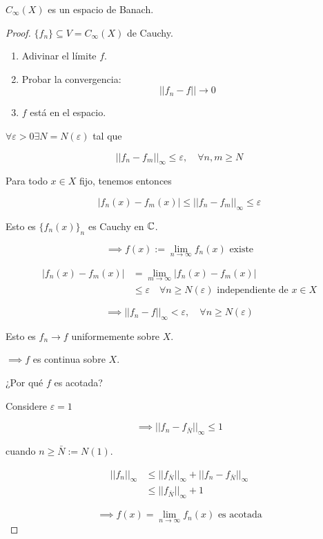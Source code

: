 \documentclass[../Apunte.tex]{subfiles}
\begin{document}
\begin{fproposition}
    $C_\infty(X)$ es un espacio de Banach.
\end{fproposition}

\begin{proof}
    $\{f_n\}\subseteq V=C_\infty(X)$ de Cauchy.

    \begin{enumerate}
        \item Adivinar el límite $f$.
        \item Probar la convergencia:
        \[||f_n-f||\to 0\]
        \item $f$ está en el espacio.
    \end{enumerate}

    $\forall \varepsilon>0\exists N=N(\varepsilon)$ tal que

    \[||f_n-f_m||_\infty\leq \varepsilon,\quad \forall n,m\geq N\]

    Para todo $x\in X$ fijo, tenemos entonces 

    \[|f_n(x)-f_m(x)|\leq ||f_n-f_m||_\infty\leq \varepsilon\]

    Esto es $\{f_n(x)\}_n$ es Cauchy en $\mathbb{C}$.

    \[\implies f(x):=\lim_{n\to\infty} f_n(x) \text{ existe}\]

    \begin{align*}|f_n(x)-f_m(x)|&=\lim_{m\to\infty} |f_n(x)-f_m(x)|\\
    &\leq \varepsilon \quad \forall n\geq N(\varepsilon) \text{ independiente de }x\in X
\end{align*}

    \[\implies ||f_n-f||_\infty<\varepsilon,\quad \forall n\geq N(\varepsilon)\]

    Esto es $f_n\to f$ uniformemente sobre $X$.

    $\implies f$ es continua sobre $X$. 

    ¿Por qué $f$ es acotada?

    Considere $\varepsilon=1$

    \[\implies ||f_n-f_{\bar N}||_\infty \leq 1\]

    cuando $n\geq \bar N:=N(1)$.

    \begin{align*}||f_n||_\infty &\leq ||f_{\bar N}||_\infty + ||f_n-f_{\bar N}||_\infty\\
    &\leq ||f_{\bar N}||_\infty +1\end{align*}

    \[\implies f(x)=\lim_{n\to\infty} f_n(x)\text{ es acotada}\]


\end{proof}
\end{document}
